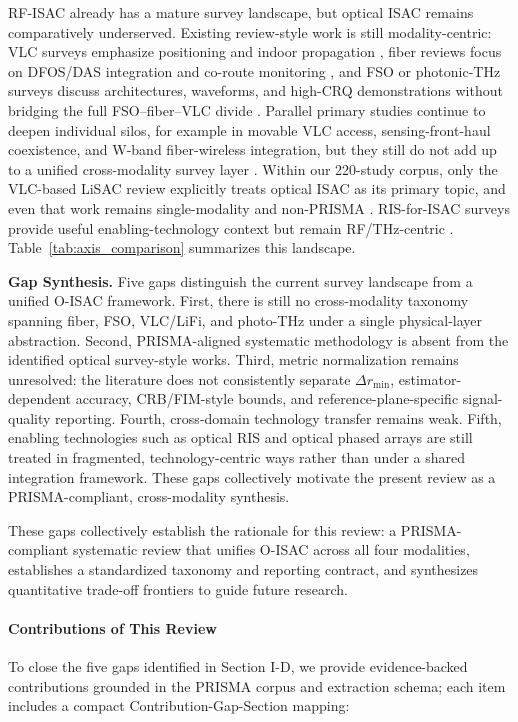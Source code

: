 \documentclass[letterpaper,journal]{IEEEtran}
\begin{document}
RF-ISAC already has a mature survey landscape, but optical ISAC remains comparatively underserved. Existing review-style work is still modality-centric: VLC surveys emphasize positioning and indoor propagation \cite{O_ISAC_068,O_ISAC_327}, fiber reviews focus on DFOS/DAS integration and co-route monitoring \cite{O_ISAC_006,O_ISAC_041,O_ISAC_090}, and FSO or photonic-THz surveys discuss architectures, waveforms, and high-CRQ demonstrations without bridging the full FSO--fiber--VLC divide \cite{O_ISAC_021,O_ISAC_035,O_ISAC_058,O_ISAC_070}. Parallel primary studies continue to deepen individual silos, for example in movable VLC access, sensing-front-haul coexistence, and W-band fiber-wireless integration, but they still do not add up to a unified cross-modality survey layer \cite{O_ISAC_015,O_ISAC_018,O_ISAC_044}. Within our 220-study corpus, only the VLC-based LiSAC review explicitly treats optical ISAC as its primary topic, and even that work remains single-modality and non-PRISMA \cite{O_ISAC_303}. RIS-for-ISAC surveys provide useful enabling-technology context but remain RF/THz-centric \cite{O_ISAC_163}. Table~\ref{tab:axis_comparison} summarizes this landscape.

\textbf{Gap Synthesis.} Five gaps distinguish the current survey landscape from a unified O-ISAC framework. First, there is still no cross-modality taxonomy spanning fiber, FSO, VLC/LiFi, and photo-THz under a single physical-layer abstraction. Second, PRISMA-aligned systematic methodology is absent from the identified optical survey-style works. Third, metric normalization remains unresolved: the literature does not consistently separate $\Delta r_{\min}$, estimator-dependent accuracy, CRB/FIM-style bounds, and reference-plane-specific signal-quality reporting. Fourth, cross-domain technology transfer remains weak. Fifth, enabling technologies such as optical RIS and optical phased arrays are still treated in fragmented, technology-centric ways rather than under a shared integration framework. These gaps collectively motivate the present review as a PRISMA-compliant, cross-modality synthesis.


These gaps collectively establish the rationale for this review: a PRISMA-compliant systematic review that unifies O-ISAC across all four modalities, establishes a standardized taxonomy and reporting contract, and synthesizes quantitative trade-off frontiers to guide future research.

\paragraph{Contributions of This Review}
To close the five gaps identified in Section I-D, we provide evidence-backed contributions grounded in the PRISMA corpus and extraction schema; each item includes a compact Contribution-Gap-Section mapping:
\end{document}
